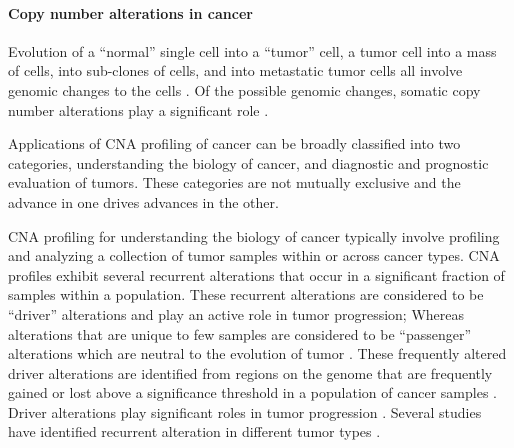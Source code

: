 \paragraph{Copy number alterations in cancer}
Evolution of a ``normal'' single cell into a ``tumor'' cell, a tumor
cell into a mass of cells, into sub-clones of cells, and into metastatic
tumor cells all involve genomic changes to the cells
\citep{stratton2009cancer}. Of the possible genomic changes, somatic copy
number alterations play a significant role
\citep{beroukhim2010landscape,zack2013pan}.

Applications of CNA profiling of cancer can be broadly classified into
two categories, understanding the biology of cancer, and diagnostic and
prognostic evaluation of tumors. These categories are not mutually
exclusive and the advance in one drives advances in the other.

CNA profiling for understanding the biology of cancer typically involve
profiling and analyzing a collection of tumor samples within or across
cancer types.
%
CNA profiles exhibit several recurrent alterations that occur in a
significant fraction of samples within a population. These recurrent
alterations are considered to be ``driver'' alterations and play an
active role in tumor progression; Whereas alterations that are unique to
few samples are considered to be ``passenger'' alterations which are
neutral to the evolution of tumor \citep{bignell2010signatures,
beroukhim2010landscape}.
%
These frequently altered driver alterations are identified from regions
on the genome that are frequently gained or lost above a significance
threshold in a population of cancer samples \citep{mermel2011gistic2}.
%
Driver alterations play significant roles in tumor progression
\citep{bignell2010signatures, beroukhim2010landscape}.  Several studies
have identified recurrent alteration in different tumor types
\citep{beroukhim2007assessing,etemadmoghadam2009integrated,
weir2007characterizing,lin2008modeling}.



